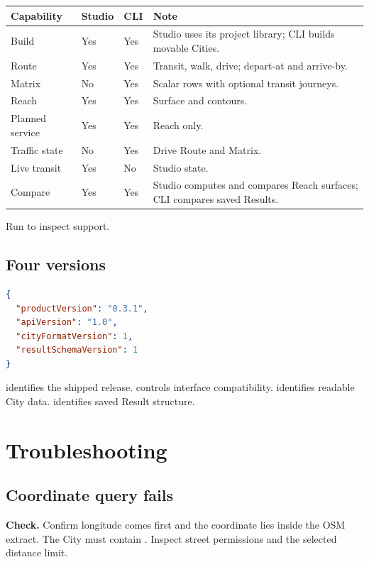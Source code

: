 \documentclass[10pt,letterpaper]{article}
\begin{document}
\begin{center}
\begin{tabularx}{\linewidth}{P{1.55in} Z Z Y}
\toprule
\textbf{Capability} & \textbf{Studio} & \textbf{CLI} & \textbf{Note} \\
\midrule
Build & Yes & Yes & Studio uses its project library; CLI builds movable Cities. \\
Route & Yes & Yes & Transit, walk, drive; depart-at and arrive-by. \\
Matrix & No & Yes & Scalar rows with optional transit journeys. \\
Reach & Yes & Yes & Surface and contours. \\
Planned service & Yes & Yes & Reach only. \\
Traffic state & No & Yes & Drive Route and Matrix. \\
Live transit & Yes & No & Studio state. \\
Compare & Yes & Yes & Studio computes and compares Reach surfaces; CLI compares saved Results. \\
\bottomrule
\end{tabularx}
\end{center}

Run  to inspect support.

\subsection{Four versions}

\begin{lstlisting}[language=json]
{
  "productVersion": "0.3.1",
  "apiVersion": "1.0",
  "cityFormatVersion": 1,
  "resultSchemaVersion": 1
}
\end{lstlisting}

 identifies the shipped release.  controls interface compatibility.  identifies readable City data.  identifies saved Result structure.

\section{Troubleshooting}

\subsection{Coordinate query fails}

\textbf{Check.} Confirm longitude comes first and the coordinate lies inside the OSM extract. The City must contain . Inspect street permissions and the selected distance limit.
\end{document}
